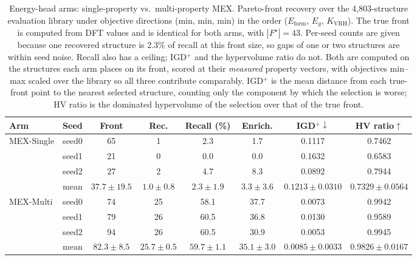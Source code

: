\begin{table}[htbp]
\renewcommand{\arraystretch}{1.2}
\setlength{\tabcolsep}{4pt}
\caption{Energy-head arms: single-property vs.\ multi-property MEX. Pareto-front recovery over the 4{,}803-structure evaluation library under objective directions (min, min, min) in the order ($E_\mathrm{form}$, $E_g$, $K_\mathrm{VRH}$). The true front is computed from DFT values and is identical for both arms, with $|F^\star|{=}43$. Per-seed counts are given because one recovered structure is 2.3\% of recall at this front size, so gaps of one or two structures are within seed noise. Recall also has a ceiling; IGD$^+$ and the hypervolume ratio do not. Both are computed on the structures each arm places on its front, scored at their \emph{measured} property vectors, with objectives min--max scaled over the library so all three contribute comparably. IGD$^+$ is the mean distance from each true-front point to the nearest selected structure, counting only the component by which the selection is worse; HV ratio is the dominated hypervolume of the selection over that of the true front.}
\label{tab:pareto_arms_mex_heldout}
\centering
\footnotesize
\begin{tabular}{@{}llcccccc@{}}
\hline\hline
\textbf{Arm} & \textbf{Seed} & \textbf{Front} & \textbf{Rec.} & \textbf{Recall (\%)} & \textbf{Enrich.} & \textbf{IGD$^+\downarrow$} & \textbf{HV ratio$\uparrow$} \\
\hline
\multirow{4}{*}{MEX-Single}
  & seed0 & 65 & 1 & 2.3 & 1.7 & 0.1117 & 0.7462 \\
  & seed1 & 21 & 0 & 0.0 & 0.0 & 0.1632 & 0.6583 \\
  & seed2 & 27 & 2 & 4.7 & 8.3 & 0.0892 & 0.7944 \\
  & mean & $37.7 \pm 19.5$ & $1.0 \pm 0.8$ & $2.3 \pm 1.9$ & $3.3 \pm 3.6$ & $0.1213 \pm 0.0310$ & $0.7329 \pm 0.0564$ \\
\hline
\multirow{4}{*}{MEX-Multi}
  & seed0 & 74 & 25 & 58.1 & 37.7 & 0.0073 & 0.9942 \\
  & seed1 & 79 & 26 & 60.5 & 36.8 & 0.0130 & 0.9589 \\
  & seed2 & 94 & 26 & 60.5 & 30.9 & 0.0053 & 0.9945 \\
  & mean & $82.3 \pm 8.5$ & $25.7 \pm 0.5$ & $59.7 \pm 1.1$ & $35.1 \pm 3.0$ & $0.0085 \pm 0.0033$ & $0.9826 \pm 0.0167$ \\
\hline\hline
\end{tabular}
\end{table}
